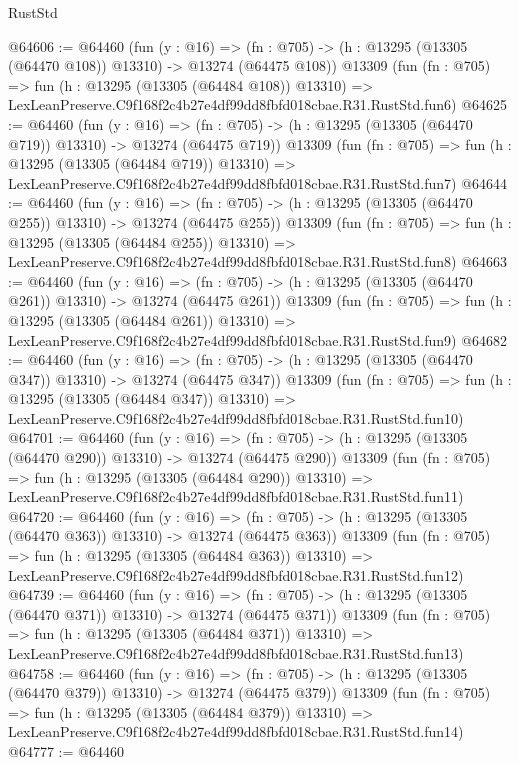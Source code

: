 \begin{lexlean}{RustStd}
\begin{coremodule}
@64606 := @64460
    (fun (y : @16) =>
    (fn : @705) -> (h : @13295 (@13305 (@64470 @108)) @13310) -> @13274 (@64475 @108))
    @13309
    (fun (fn : @705) =>
    fun (h : @13295 (@13305 (@64484 @108)) @13310) =>
    LexLeanPreserve.C9f168f2c4b27e4df99dd8fbfd018cbae.R31.RustStd.fun6)
@64625 := @64460
    (fun (y : @16) =>
    (fn : @705) -> (h : @13295 (@13305 (@64470 @719)) @13310) -> @13274 (@64475 @719))
    @13309
    (fun (fn : @705) =>
    fun (h : @13295 (@13305 (@64484 @719)) @13310) =>
    LexLeanPreserve.C9f168f2c4b27e4df99dd8fbfd018cbae.R31.RustStd.fun7)
@64644 := @64460
    (fun (y : @16) =>
    (fn : @705) -> (h : @13295 (@13305 (@64470 @255)) @13310) -> @13274 (@64475 @255))
    @13309
    (fun (fn : @705) =>
    fun (h : @13295 (@13305 (@64484 @255)) @13310) =>
    LexLeanPreserve.C9f168f2c4b27e4df99dd8fbfd018cbae.R31.RustStd.fun8)
@64663 := @64460
    (fun (y : @16) =>
    (fn : @705) -> (h : @13295 (@13305 (@64470 @261)) @13310) -> @13274 (@64475 @261))
    @13309
    (fun (fn : @705) =>
    fun (h : @13295 (@13305 (@64484 @261)) @13310) =>
    LexLeanPreserve.C9f168f2c4b27e4df99dd8fbfd018cbae.R31.RustStd.fun9)
@64682 := @64460
    (fun (y : @16) =>
    (fn : @705) -> (h : @13295 (@13305 (@64470 @347)) @13310) -> @13274 (@64475 @347))
    @13309
    (fun (fn : @705) =>
    fun (h : @13295 (@13305 (@64484 @347)) @13310) =>
    LexLeanPreserve.C9f168f2c4b27e4df99dd8fbfd018cbae.R31.RustStd.fun10)
@64701 := @64460
    (fun (y : @16) =>
    (fn : @705) -> (h : @13295 (@13305 (@64470 @290)) @13310) -> @13274 (@64475 @290))
    @13309
    (fun (fn : @705) =>
    fun (h : @13295 (@13305 (@64484 @290)) @13310) =>
    LexLeanPreserve.C9f168f2c4b27e4df99dd8fbfd018cbae.R31.RustStd.fun11)
@64720 := @64460
    (fun (y : @16) =>
    (fn : @705) -> (h : @13295 (@13305 (@64470 @363)) @13310) -> @13274 (@64475 @363))
    @13309
    (fun (fn : @705) =>
    fun (h : @13295 (@13305 (@64484 @363)) @13310) =>
    LexLeanPreserve.C9f168f2c4b27e4df99dd8fbfd018cbae.R31.RustStd.fun12)
@64739 := @64460
    (fun (y : @16) =>
    (fn : @705) -> (h : @13295 (@13305 (@64470 @371)) @13310) -> @13274 (@64475 @371))
    @13309
    (fun (fn : @705) =>
    fun (h : @13295 (@13305 (@64484 @371)) @13310) =>
    LexLeanPreserve.C9f168f2c4b27e4df99dd8fbfd018cbae.R31.RustStd.fun13)
@64758 := @64460
    (fun (y : @16) =>
    (fn : @705) -> (h : @13295 (@13305 (@64470 @379)) @13310) -> @13274 (@64475 @379))
    @13309
    (fun (fn : @705) =>
    fun (h : @13295 (@13305 (@64484 @379)) @13310) =>
    LexLeanPreserve.C9f168f2c4b27e4df99dd8fbfd018cbae.R31.RustStd.fun14)
@64777 := @64460

\end{coremodule}
\end{lexlean}
